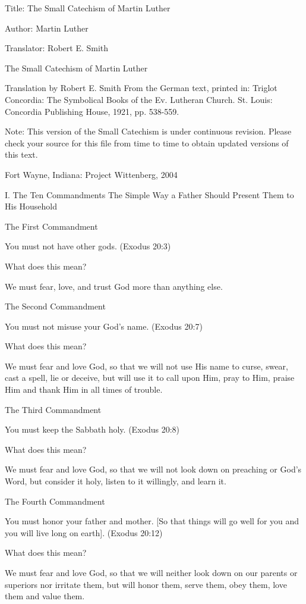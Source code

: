 Title: The Small Catechism of Martin Luther

Author: Martin Luther

Translator: Robert E. Smith

The Small Catechism of Martin Luther

Translation by Robert E. Smith From the German text, printed in:
Triglot Concordia: The Symbolical Books of the Ev. Lutheran Church.
St. Louis: Concordia Publishing House, 1921, pp. 538-559.

Note: This version of the Small Catechism is under continuous
revision. Please check your source for this file from time to time to
obtain updated versions of this text.

Fort Wayne, Indiana: Project Wittenberg, 2004

I. The Ten Commandments
The Simple Way a Father Should Present Them to His Household

The First Commandment

You must not have other gods. (Exodus 20:3)

What does this mean?

We must fear, love, and trust God more than anything else.

The Second Commandment

You must not misuse your God's name. (Exodus 20:7)

What does this mean?

We must fear and love God, so that we will not use His name to curse,
swear, cast a spell, lie or deceive, but will use it to call upon Him,
pray to Him, praise Him and thank Him in all times of trouble.

The Third Commandment

You must keep the Sabbath holy. (Exodus 20:8)

What does this mean?

We must fear and love God, so that we will not look down on preaching
or God's Word, but consider it holy, listen to it willingly, and learn
it.

The Fourth Commandment

You must honor your father and mother. [So that things will go well for
you and you will live long on earth]. (Exodus 20:12)

What does this mean?

We must fear and love God, so that we will neither look down on our
parents or superiors nor irritate them, but will honor them, serve
them, obey them, love them and value them.


